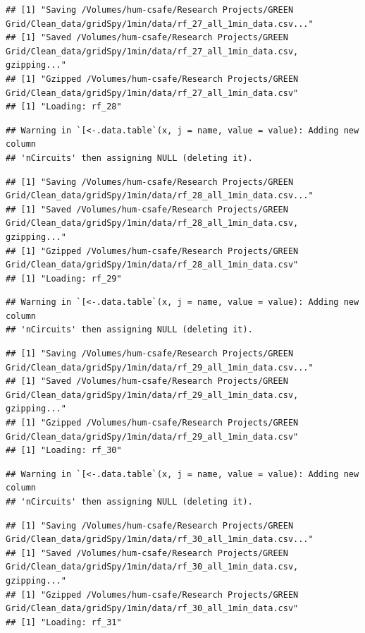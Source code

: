\documentclass[]{article}
\begin{document}
\begin{verbatim}
## [1] "Saving /Volumes/hum-csafe/Research Projects/GREEN Grid/Clean_data/gridSpy/1min/data/rf_27_all_1min_data.csv..."
## [1] "Saved /Volumes/hum-csafe/Research Projects/GREEN Grid/Clean_data/gridSpy/1min/data/rf_27_all_1min_data.csv, gzipping..."
## [1] "Gzipped /Volumes/hum-csafe/Research Projects/GREEN Grid/Clean_data/gridSpy/1min/data/rf_27_all_1min_data.csv"
## [1] "Loading: rf_28"
\end{verbatim}

\begin{verbatim}
## Warning in `[<-.data.table`(x, j = name, value = value): Adding new column
## 'nCircuits' then assigning NULL (deleting it).
\end{verbatim}

\begin{verbatim}
## [1] "Saving /Volumes/hum-csafe/Research Projects/GREEN Grid/Clean_data/gridSpy/1min/data/rf_28_all_1min_data.csv..."
## [1] "Saved /Volumes/hum-csafe/Research Projects/GREEN Grid/Clean_data/gridSpy/1min/data/rf_28_all_1min_data.csv, gzipping..."
## [1] "Gzipped /Volumes/hum-csafe/Research Projects/GREEN Grid/Clean_data/gridSpy/1min/data/rf_28_all_1min_data.csv"
## [1] "Loading: rf_29"
\end{verbatim}

\begin{verbatim}
## Warning in `[<-.data.table`(x, j = name, value = value): Adding new column
## 'nCircuits' then assigning NULL (deleting it).
\end{verbatim}

\begin{verbatim}
## [1] "Saving /Volumes/hum-csafe/Research Projects/GREEN Grid/Clean_data/gridSpy/1min/data/rf_29_all_1min_data.csv..."
## [1] "Saved /Volumes/hum-csafe/Research Projects/GREEN Grid/Clean_data/gridSpy/1min/data/rf_29_all_1min_data.csv, gzipping..."
## [1] "Gzipped /Volumes/hum-csafe/Research Projects/GREEN Grid/Clean_data/gridSpy/1min/data/rf_29_all_1min_data.csv"
## [1] "Loading: rf_30"
\end{verbatim}

\begin{verbatim}
## Warning in `[<-.data.table`(x, j = name, value = value): Adding new column
## 'nCircuits' then assigning NULL (deleting it).
\end{verbatim}

\begin{verbatim}
## [1] "Saving /Volumes/hum-csafe/Research Projects/GREEN Grid/Clean_data/gridSpy/1min/data/rf_30_all_1min_data.csv..."
## [1] "Saved /Volumes/hum-csafe/Research Projects/GREEN Grid/Clean_data/gridSpy/1min/data/rf_30_all_1min_data.csv, gzipping..."
## [1] "Gzipped /Volumes/hum-csafe/Research Projects/GREEN Grid/Clean_data/gridSpy/1min/data/rf_30_all_1min_data.csv"
## [1] "Loading: rf_31"
\end{verbatim}
\end{document}
